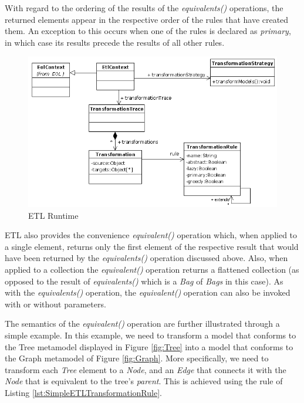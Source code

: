 With regard to the ordering of the results of the \emph{equivalents()} operations, the returned elements appear in the respective order of the rules that have created them. An exception to this occurs when one of the rules is declared as \emph{primary}, in which case its results precede the results of all other rules.

\begin{landscape}
\begin{figure}
	\centering
		\includegraphics{images/EtlRuntime.png}
	\caption{ETL Runtime}
	\label{fig:EtlRuntime}
\end{figure}
\end{landscape}


ETL also provides the convenience \emph{equivalent()} operation which, when applied to a single element, returns only the first element of the respective result that would have been returned by the \emph{equivalents()} operation discussed above. Also, when applied to a collection the \emph{equivalent()} operation returns a flattened collection (as opposed to the result of \emph{equivalents()} which is a \emph{Bag} of \emph{Bags} in this case). As with the \emph{equivalents()} operation, the \emph{equivalent()} operation can also be invoked with or without parameters.

The semantics of the \emph{equivalent()} operation are further illustrated through a simple example. In this example, we need to transform a model that conforms to the Tree metamodel displayed in Figure \ref{fig:Tree} into a model that conforms to the Graph metamodel of Figure \ref{fig:Graph}. More specifically, we need to transform each \emph{Tree} element to a \emph{Node}, and an \emph{Edge} that connects it with the \emph{Node} that is equivalent to the tree's \emph{parent}. This is achieved using the rule of Listing \ref{lst:SimpleETLTransformationRule}. 

